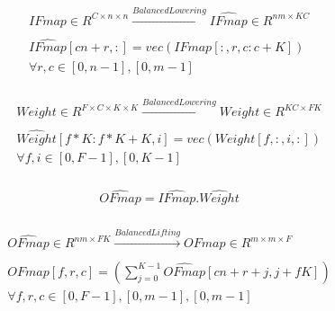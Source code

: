 \begin{align}
    \begin{gathered}
        IFmap \in R^{C\times n\times n} \xrightarrow[]{Balanced Lowering} \hat{IFmap} \in R^{nm\times KC} \\
        \hat{IFmap}[cn+r, :] = vec(IFmap[:, r, c:c+K]) \\
        \forall r,c \in [0, n-1], [0, m-1]
    \end{gathered}
    \label{math:balanced_lowering_ifmap}
\end{align}

\begin{align}
    \begin{gathered}
        Weight \in R^{F\times C\times K \times K} \xrightarrow[]{Balanced Lowering} \hat{Weight} \in R^{KC\times FK}\\
        \hat{Weight}[f*K:f*K+K, i] = vec(Weight[f, :, i, :]) \\
        \forall f,i \in [0, F-1], [0, K-1]
    \end{gathered}
    \label{math:balanced_lowering_weight}
\end{align}

\begin{align}
    \begin{gathered}
        \hat{OFmap} = \hat{IFmap}.\hat{Weight}
    \end{gathered}
    \label{math:balanced_lowering_gemm}
\end{align}

\begin{align}
    \begin{gathered}
        \hat{OFmap} \in R^{nm\times FK} \xrightarrow[]{Balanced Lifting} OFmap \in  R^{m\times m\times F}\\
        OFmap[f, r, c] = (\displaystyle\sum\limits_{j=0}^{K-1} \hat{OFmap}[cn+r+j, j+fK]) \\
        \forall f,r,c \in [0, F-1], [0, m-1], [0, m-1]
    \end{gathered}
    \label{math:balanced_lifting_ofmap}
\end{align}

